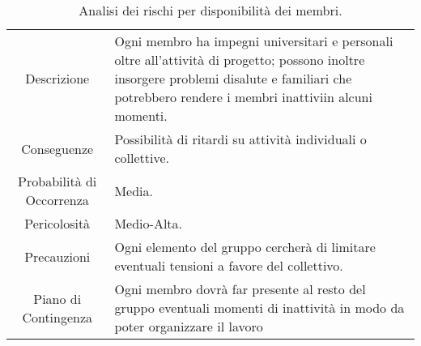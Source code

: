     \begin{table}[H]
        \begin{tabular}{|c|p{10cm}|}
        \hline
        \rowcolor{darkblue}
        \multicolumn{2}{|c|}{\textbf{RG2 - Disponibilità dei Membri}} \\
        \hline
         Descrizione & Ogni membro ha impegni universitari e personali oltre all’attività di progetto; possono inoltre insorgere problemi disalute e familiari che potrebbero rendere i membri inattiviin alcuni momenti.\\ 
         \hline
         Conseguenze & Possibilità di ritardi su attività individuali o collettive.\\
         \hline
         Probabilità di Occorrenza & Media.\\
         \hline
         Pericolosità & Medio-Alta.\\
         \hline
         Precauzioni & Ogni elemento del gruppo cercherà di limitare eventuali tensioni a favore del collettivo.\\
         \hline
         Piano di Contingenza & Ogni membro dovrà far presente al resto del gruppo eventuali momenti di inattività in modo da poter organizzare il lavoro\\ 
         \hline
        \end{tabular}
        \caption{\label{tab:RG2}Analisi dei rischi per disponibilità dei membri.}
    \end{table}


